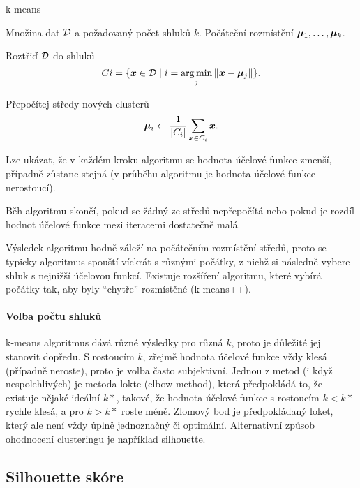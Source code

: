 \begin{algorithm}[H]
    \renewcommand{\thealgorithm}{}
    \caption{k-means}
    \begin{algorithmic}[1]
        \Require
        \Statex Množina dat $\mathcal{D}$ a požadovaný počet shluků $k$.
        \Statex Počáteční rozmístění $\bm{\mu}_1, \ldots, \bm{\mu}_k$.
        \Statex

        \State Roztřiď $\mathcal{D}$ do shluků
        \[
            Ci = \{ \bm{x} \in \mathcal{D} \mid i = \operatorname*{arg\,min}_j \| \bm{x} - \bm{\mu}_j \| \}.
        \]

        \State Přepočítej středy nových clusterů
        \[
            \bm{\mu}_i \leftarrow \frac{1}{|C_i|} \sum_{\bm{x} \in C_i} \bm{x}.
        \]
        \EndWhile
    \end{algorithmic}
\end{algorithm}

Lze ukázat, že v každém kroku algoritmu se hodnota účelové funkce zmenší, případně zůstane stejná (v průběhu algoritmu je hodnota účelové funkce nerostoucí).

Běh algoritmu skončí, pokud se žádný ze středů nepřepočítá nebo pokud je rozdíl hodnot účelové funkce mezi iteracemi dostatečně malá.

Výsledek algoritmu hodně záleží na počátečním rozmístění středů, proto se typicky algoritmus spouští víckrát s různými počátky, z nichž si následně vybere shluk s nejnižší účelovou funkcí. Existuje rozšíření algoritmu, které vybírá počátky tak, aby byly ``chytře'' rozmístěné (k-means++).

\paragraph{Volba počtu shluků}

k-means algoritmus dává různé výsledky pro různá $k$, proto je důležité jej stanovit dopředu. S rostoucím $k$, zřejmě hodnota účelové funkce vždy klesá (případně neroste), proto je volba často subjektivní. Jednou z metod (i když nespolehlivých) je metoda lokte (elbow method), která předpokládá to, že existuje nějaké ideální $k*$, takové, že hodnota účelové funkce s rostoucím $k < k*$ rychle klesá, a pro $k > k*$ roste méně. Zlomový bod je předpokládaný loket, který ale není vždy úplně jednoznačný či optimální. Alternativní způsob ohodnocení clusteringu je například silhouette.

\subsection{Silhouette skóre}

